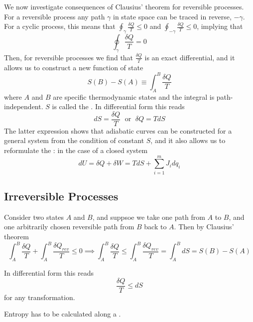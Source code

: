 \documentclass[12pt, a4paper, oneside, openright, titlepage]{book}
\begin{document}
We now investigate consequences of Clausius' theorem for reversible processes. For a reversible process any path $\gamma$ in state space can be traced in reverse, $-\gamma$. For a cyclic process, this means that $\oint_{\gamma}\frac{\delta Q}{T} \leq 0$ and $\oint_{-\gamma}\frac{\delta Q}{T} \leq 0$, implying that \begin{equation*}
    \oint_{\gamma}\frac{\delta Q}{T} = 0
\end{equation*}
Then, for reversible processes we find that $\frac{\delta Q}{T}$ is an exact differential, and it allows us to construct a new function of state \begin{equation*}
    S(B) - S(A) \equiv \int_A^B\frac{\delta Q}{T}
\end{equation*}
where $A$ and $B$ are specific thermodynamic states and the integral is path-independent. $S$ is called the . In differential form this reads \begin{equation*}
    dS = \frac{\delta Q}{T}\;\text{ or }\;\delta Q = TdS
\end{equation*}
The latter expression shows that adiabatic curves can be constructed for a general system from the condition of constant $S$, and it also allows us to reformulate the : in the case of a closed system \begin{equation*}
    dU = \delta Q + \delta W = TdS + \sum_{i=1}^mJ_idq_i
\end{equation*}


\subsection{Irreversible Processes}

Consider two states $A$ and $B$, and suppsoe we take one path from $A$ to $B$, and one arbitrarily chosen reversible path from $B$ back to $A$. Then by Clausius' theorem \begin{equation*}
    \int_A^B\frac{\delta Q}{T} + \int_A^B\frac{\delta Q_{rev}}{T} \leq 0 \implies \int_A^B\frac{\delta Q}{T} \leq \int_A^B\frac{\delta Q_{rev}}{T} = \int_A^BdS = S(B) - S(A)
\end{equation*}

In differential form this reads \begin{equation*}
    \frac{\delta Q}{T} \leq dS
\end{equation*}
for any transformation. 
\begin{note}
    Entropy has to be calculated along a .
\end{note}
\end{document}
